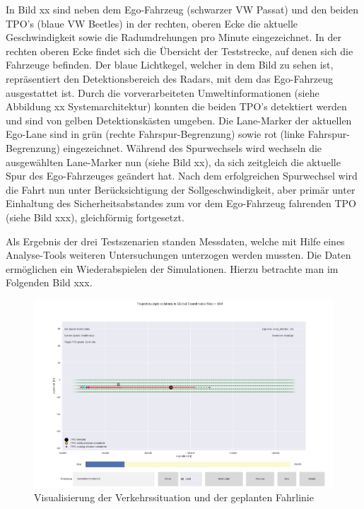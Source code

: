 In Bild xx sind neben dem Ego-Fahrzeug (schwarzer VW Passat) und den beiden TPO's (blaue VW Beetles) in der rechten, oberen Ecke die aktuelle Geschwindigkeit sowie die Radumdrehungen pro Minute eingezeichnet. In der rechten oberen Ecke findet sich die Übersicht der Teststrecke, auf denen sich die Fahrzeuge befinden. Der blaue Lichtkegel, welcher in dem Bild zu sehen ist, repräsentiert den Detektionsbereich des Radars, mit dem das Ego-Fahrzeug ausgestattet ist. Durch die vorverarbeiteten Umweltinformationen (siehe Abbildung xx Systemarchitektur) konnten die beiden TPO's detektiert werden und sind von gelben Detektionskästen umgeben. Die Lane-Marker der aktuellen Ego-Lane sind in grün (rechte Fahrspur-Begrenzung) sowie rot (linke Fahrspur-Begrenzung) eingezeichnet. Während des Spurwechsels wird wechseln die ausgewählten Lane-Marker nun (siehe Bild xx), da sich zeitgleich die aktuelle Spur des Ego-Fahrzeuges geändert hat. Nach dem erfolgreichen Spurwechsel wird die Fahrt nun unter Berücksichtigung der Sollgeschwindigkeit, aber primär unter Einhaltung des Sicherheitsabstandes zum vor dem Ego-Fahrzeug fahrenden TPO (siehe Bild xxx), gleichförmig fortgesetzt.

Als Ergebnis der drei Testszenarien standen Messdaten, welche mit Hilfe eines Analyse-Tools weiteren Untersuchungen unterzogen werden mussten. Die Daten ermöglichen ein \glqq Wiederabspielen\grqq{} der Simulationen. Hierzu betrachte man im Folgenden Bild xxx. 

\begin{figure}[!ht]
	\begin{center}
	\includegraphics[width=1.0\linewidth]{Abbildungen/bericht/process_logged_data_lc_part1}
	\caption{Visualisierung der Verkehrssituation und der geplanten Fahrlinie}
	\label{fig.process_logged_data_part1}
\end{center}
\end{figure} 

